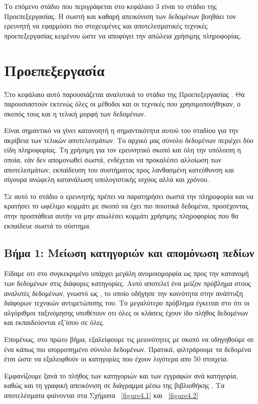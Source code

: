 Το επόμενο στάδιο που περιγράφεται στο κεφάλαιο 3 είναι το στάδιο της Προεπεξεργασίας. Η σωστή και καθαρή απεικόνιση των δεδομένων βοηθάει τον ερευνητή να εφαρμόσει πιο στοχευμένες και αποτελεσματικές τεχνικές προεπεξεργασίας κειμένου ώστε να αποφύγει την απώλεια χρήσιμης πληροφορίας. 


\clearpage
\section{Προεπεξεργασία }
Στο κεφάλαιο αυτό  παρουσιάζεται αναλυτικά το στάδιο της Προεπεξεργασίας . Θα παρουσιαστούν εκτενώς όλες οι μέθοδοι και οι τεχνικές που χρησιμοποιήθηκαν, ο σκοπός τους και η τελική μορφή των δεδομένων. 

Είναι σημαντικό να γίνει κατανοητή η σημαντικότητα αυτού του σταδίου για την ακρίβεια των τελικών αποτελεσμάτων. Το αρχικό μας σύνολο δεδομένων περιέχει δύο είδη πληροφορίας. Τη χρήσιμη για τον ερευνητικό σκοπό και όλη την υπόλοιπη η οποία, εάν δεν απομονωθεί σωστά, ενδέχεται να προκαλέσει αλλοίωση των αποτελεσμάτων, εκπαίδευση του συστήματος προς λανθασμένη κατεύθυνση και σίγουρα ανώφελη κατανάλωση υπολογιστικής ισχύος αλλά και χρόνου.

Σε αυτό το στάδιο ο ερευνητής πρέπει να παρατηρήσει σωστά την πληροφορία και να κρατήσει το ωφέλιμο κομμάτι με σκοπό να έχει πιο ποιοτικά δεδομένα, προσέχοντας στην προσπάθεια αυτήν να μην απωλέσει κομμάτι χρήσιμης πληροφορίας που θα εκπαίδευε σωστά το σύστημα.


\subsection{Βήμα 1: Μείωση κατηγοριών και απομόνωση πεδίων}
Είδαμε οτι στο συγκεκριμένο  υπάρχει μεγάλη ανομοιομορφία ως προς την κατανομή των δεδομένων στις διάφορες κατηγορίες. Αυτό αποτελεί ένα μείζον πρόβλημα στους αναλυτές δεδομένων, γνωστό ως , το οποίο οδήγησε την κοινότητα στην ανάπτυξη διάφορων τεχνικών αντιμετώπισης του. Το μεγαλύτερο πρόβλημα έγκειται στο ότι οι αλγόριθμοι ταξινόμησης υποθέτουν οτι όλες οι κλάσεις έχουν ίδο πλήθος δεδομένων και εκπαιδεύονται εξ'ίσου σε όλες.

Επομένως, στο πρώτο βήμα, εξαλείφουμε τις μειονότητες με σκοπό να οδηγηθούμε σε ένα κάπως πιο ισορροπημένο σύνολο δεδομένων. Πρατικά, φιλτράρουμε τα δεδομένα έτσι ώστε να εξαλειφθούν οι κατηγορίες που έχουν λιγότερα απο 50 στοιχεία. 

Εμφανίζουμε ξανά το πλήθος των κατηγοριών και των εγγραφών ανά κατηγορία, καθώς και τη γραφική απεικόνιση σε διάγραμμα μέσω της βιβλιοθήκης . Τα αποτελέσματα φαίνονται στα Σχήματα ~\ref{figure4.1} και ~\ref{figure4.2}
\clearpage

